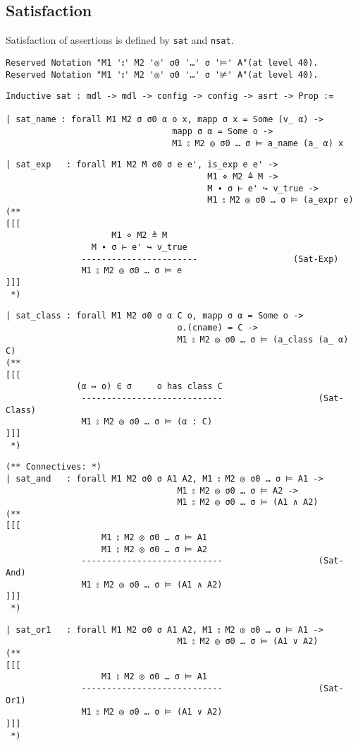 \documentclass[12pt]{article}
\begin{document}
\subsection{Satisfaction}

Satisfaction of assertions is defined by \verb|sat| and \verb|nsat|.
\begin{verbatim}
Reserved Notation "M1 '⦂' M2 '◎' σ0 '…' σ '⊨' A"(at level 40).
Reserved Notation "M1 '⦂' M2 '◎' σ0 '…' σ '⊭' A"(at level 40).
\end{verbatim}
\begin{verbatim}
Inductive sat : mdl -> mdl -> config -> config -> asrt -> Prop :=

| sat_name : forall M1 M2 σ σ0 α o x, mapp σ x = Some (v_ α) ->
                                 mapp σ α = Some o ->
                                 M1 ⦂ M2 ◎ σ0 … σ ⊨ a_name (a_ α) x
\end{verbatim}
\begin{verbatim}
| sat_exp   : forall M1 M2 M σ0 σ e e', is_exp e e' ->
                                        M1 ⋄ M2 ≜ M ->
                                        M ∙ σ ⊢ e' ↪ v_true ->
                                        M1 ⦂ M2 ◎ σ0 … σ ⊨ (a_expr e)
(**
[[[
                     M1 ⋄ M2 ≜ M 
                 M ∙ σ ⊢ e' ↪ v_true
               -----------------------                   (Sat-Exp)
               M1 ⦂ M2 ◎ σ0 … σ ⊨ e
]]]
 *)
\end{verbatim}
\begin{verbatim}
| sat_class : forall M1 M2 σ0 σ α C o, mapp σ α = Some o -> 
                                  o.(cname) = C ->
                                  M1 ⦂ M2 ◎ σ0 … σ ⊨ (a_class (a_ α)  C)
(**
[[[
              (α ↦ o) ∈ σ     o has class C
               ----------------------------                   (Sat-Class)
               M1 ⦂ M2 ◎ σ0 … σ ⊨ (α : C)
]]]
 *)
\end{verbatim}
\begin{verbatim}
(** Connectives: *)
| sat_and   : forall M1 M2 σ0 σ A1 A2, M1 ⦂ M2 ◎ σ0 … σ ⊨ A1 ->
                                  M1 ⦂ M2 ◎ σ0 … σ ⊨ A2 ->
                                  M1 ⦂ M2 ◎ σ0 … σ ⊨ (A1 ∧ A2)
(**
[[[
                   M1 ⦂ M2 ◎ σ0 … σ ⊨ A1
                   M1 ⦂ M2 ◎ σ0 … σ ⊨ A2
               ----------------------------                   (Sat-And)
               M1 ⦂ M2 ◎ σ0 … σ ⊨ (A1 ∧ A2)
]]]
 *)
\end{verbatim}
\begin{verbatim}
| sat_or1   : forall M1 M2 σ0 σ A1 A2, M1 ⦂ M2 ◎ σ0 … σ ⊨ A1 ->
                                  M1 ⦂ M2 ◎ σ0 … σ ⊨ (A1 ∨ A2)
(**
[[[
                   M1 ⦂ M2 ◎ σ0 … σ ⊨ A1
               ----------------------------                   (Sat-Or1)
               M1 ⦂ M2 ◎ σ0 … σ ⊨ (A1 ∨ A2)
]]]
 *)
\end{verbatim}
\end{document}

